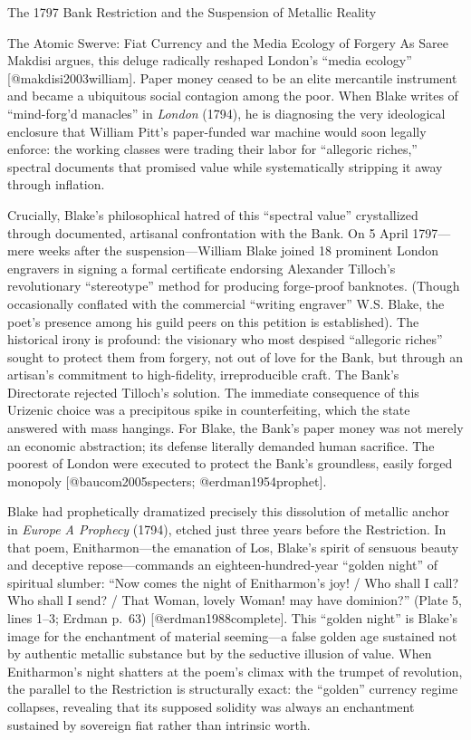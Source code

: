 \documentclass[
  ignorenonframetext,
]{beamer}
\begin{document}
\begin{frame}{The 1797 Bank Restriction and the Suspension of Metallic
Reality}
\begin{block}{The Atomic Swerve: Fiat Currency and the Media Ecology of
Forgery}
As Saree Makdisi argues, this deluge radically reshaped London's ``media
ecology'' {[}@makdisi2003william{]}. Paper money ceased to be an elite
mercantile instrument and became a ubiquitous social contagion among the
poor. When Blake writes of ``mind-forg'd manacles'' in \emph{London}
(1794), he is diagnosing the very ideological enclosure that William
Pitt's paper-funded war machine would soon legally enforce: the working
classes were trading their labor for ``allegoric riches,'' spectral
documents that promised value while systematically stripping it away
through inflation.

Crucially, Blake's philosophical hatred of this ``spectral value''
crystallized through documented, artisanal confrontation with the Bank.
On 5 April 1797---mere weeks after the suspension---William Blake joined
18 prominent London engravers in signing a formal certificate endorsing
Alexander Tilloch's revolutionary ``stereotype'' method for producing
forge-proof banknotes. (Though occasionally conflated with the
commercial ``writing engraver'' W.S. Blake, the poet's presence among
his guild peers on this petition is established). The historical irony
is profound: the visionary who most despised ``allegoric riches'' sought
to protect them from forgery, not out of love for the Bank, but through
an artisan's commitment to high-fidelity, irreproducible craft. The
Bank's Directorate rejected Tilloch's solution. The immediate
consequence of this Urizenic choice was a precipitous spike in
counterfeiting, which the state answered with mass hangings. For Blake,
the Bank's paper money was not merely an economic abstraction; its
defense literally demanded human sacrifice. The poorest of London were
executed to protect the Bank's groundless, easily forged monopoly
{[}@baucom2005specters; @erdman1954prophet{]}.

Blake had prophetically dramatized precisely this dissolution of
metallic anchor in \emph{Europe A Prophecy} (1794), etched just three
years before the Restriction. In that poem, Enitharmon---the emanation
of Los, Blake's spirit of sensuous beauty and deceptive
repose---commands an eighteen-hundred-year ``golden night'' of spiritual
slumber: ``Now comes the night of Enitharmon's joy! / Who shall I call?
Who shall I send? / That Woman, lovely Woman! may have dominion?''
(Plate 5, lines 1--3; Erdman p.~63) {[}@erdman1988complete{]}. This
``golden night'' is Blake's image for the enchantment of material
seeming---a false golden age sustained not by authentic metallic
substance but by the seductive illusion of value. When Enitharmon's
night shatters at the poem's climax with the trumpet of revolution, the
parallel to the Restriction is structurally exact: the ``golden''
currency regime collapses, revealing that its supposed solidity was
always an enchantment sustained by sovereign fiat rather than intrinsic
worth.


\end{block}
\end{frame}
\end{document}
